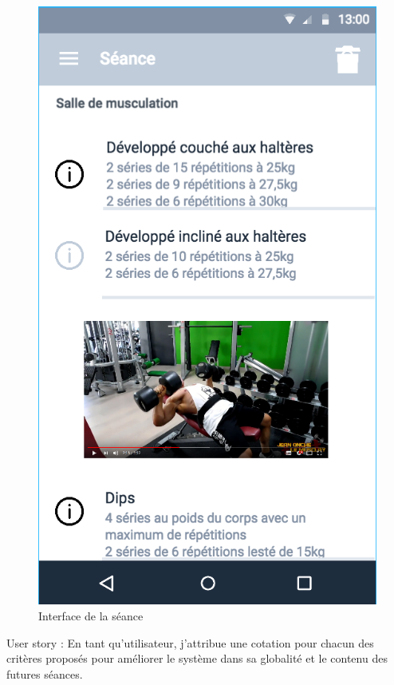 \begin{figure}[!h]
\includegraphics[scale=0.3]{ihms/get_information_about_exo}
\caption{Interface de la séance}
\end{figure}

\begin{itshape}
User story : En tant qu'utilisateur, j'attribue une cotation pour chacun des critères proposés pour améliorer le système dans sa globalité et le contenu des futures séances.

\end{itshape}

